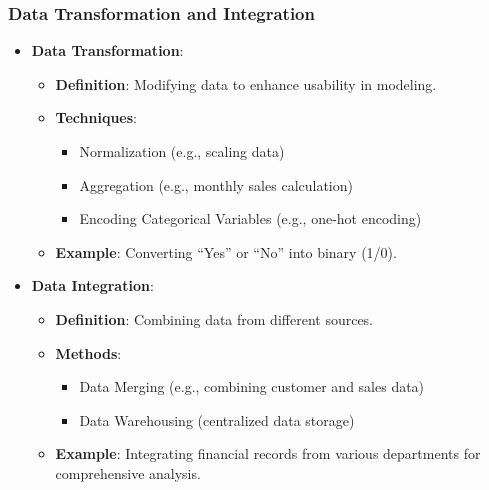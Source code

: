 \documentclass{beamer}
\begin{document}
\begin{frame}[fragile]
    \frametitle{Data Transformation and Integration}
    
    \begin{itemize}
        \item \textbf{Data Transformation}:
        \begin{itemize}
            \item \textbf{Definition}: Modifying data to enhance usability in modeling.
            \item \textbf{Techniques}:
            \begin{itemize}
                \item Normalization (e.g., scaling data)
                \item Aggregation (e.g., monthly sales calculation)
                \item Encoding Categorical Variables (e.g., one-hot encoding)
            \end{itemize}
            \item \textbf{Example}: Converting “Yes” or “No” into binary (1/0).
        \end{itemize}
        
        \item \textbf{Data Integration}:
        \begin{itemize}
            \item \textbf{Definition}: Combining data from different sources.
            \item \textbf{Methods}:
            \begin{itemize}
                \item Data Merging (e.g., combining customer and sales data)
                \item Data Warehousing (centralized data storage)
            \end{itemize}
            \item \textbf{Example}: Integrating financial records from various departments for comprehensive analysis.
        \end{itemize}
    \end{itemize}
\end{frame}
\end{document}
